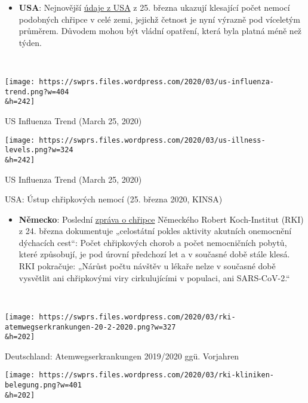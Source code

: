 \begin{itemize}
\tightlist
\item
  \textbf{USA}: Nejnovější \href{https://healthweather.us/}{údaje z USA}
  z 25. března ukazují klesající počet nemocí podobných chřipce v celé
  zemi, jejichž četnost je nyní výrazně pod víceletým průměrem. Důvodem
  mohou být vládní opatření, která byla platná méně než týden.\\
\end{itemize}

~

\href{https://swprs.org/covid-19-hinweis-ii/us-influenza-trend/}{}

\texttt{[image: https://swprs.files.wordpress.com/2020/03/us-influenza-trend.png?w=404\\\&h=242]}

US Influenza Trend (March 25, 2020)

\href{https://swprs.org/covid-19-hinweis-ii/us-illness-levels/}{}

\texttt{[image: https://swprs.files.wordpress.com/2020/03/us-illness-levels.png?w=324\\\&h=242]}

US Influenza Trend (March 25, 2020)

USA: Ústup chřipkových nemocí (25. března 2020, KINSA)

\begin{itemize}
\tightlist
\item
  \textbf{Německo}: Poslední
  \href{https://influenza.rki.de/Wochenberichte/2019_2020/2020-12.pdf}{zpráva
  o chřipce} Německého Robert Koch-Institut (RKI) z 24. března
  dokumentuje „celostátní pokles aktivity akutních onemocnění dýchacích
  cest``: Počet chřipkových chorob a počet nemocničních pobytů, které
  způsobují, je pod úrovní předchozí let a v současné době stále klesá.
  RKI pokračuje: „Nárůst počtu návštěv u lékaře nelze v současné době
  vysvětlit ani chřipkovými viry cirkulujícími v populaci, ani
  SARS-CoV-2.``
\end{itemize}

~

\href{https://swprs.org/covid-19-hinweis-ii/rki-atemwegserkrankungen-20-2-2020/}{}

\texttt{[image: https://swprs.files.wordpress.com/2020/03/rki-atemwegserkrankungen-20-2-2020.png?w=327\\\&h=202]}

Deutschland: Atemwegserkrankungen 2019/2020 ggü. Vorjahren

\href{https://swprs.org/covid-19-hinweis-ii/rki-kliniken-belegung/}{}

\texttt{[image: https://swprs.files.wordpress.com/2020/03/rki-kliniken-belegung.png?w=401\\\&h=202]}

